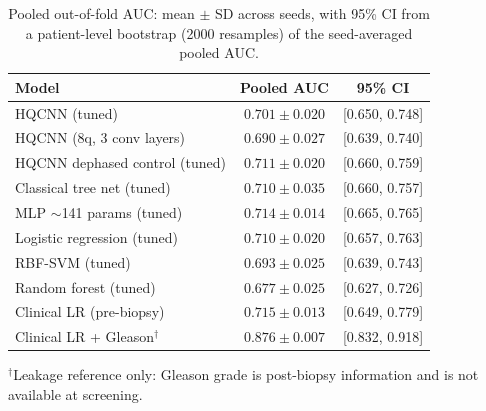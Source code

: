 \begin{table}[t]
\centering
\caption{Pooled out-of-fold AUC: mean $\pm$ SD across seeds, with 95\% CI from a patient-level bootstrap (2000 resamples) of the seed-averaged pooled AUC.}
\label{tab:v3_pooled}
\small
\begin{tabular}{lcc}
\toprule
Model & Pooled AUC & 95\% CI \\
\midrule
HQCNN (tuned) & $0.701 \pm 0.020$ & [0.650, 0.748] \\
HQCNN (8q, 3 conv layers) & $0.690 \pm 0.027$ & [0.639, 0.740] \\
HQCNN dephased control (tuned) & $0.711 \pm 0.020$ & [0.660, 0.759] \\
Classical tree net (tuned) & $0.710 \pm 0.035$ & [0.660, 0.757] \\
MLP $\sim$141 params (tuned) & $0.714 \pm 0.014$ & [0.665, 0.765] \\
Logistic regression (tuned) & $0.710 \pm 0.020$ & [0.657, 0.763] \\
RBF-SVM (tuned) & $0.693 \pm 0.025$ & [0.639, 0.743] \\
Random forest (tuned) & $0.677 \pm 0.025$ & [0.627, 0.726] \\
Clinical LR (pre-biopsy) & $0.715 \pm 0.013$ & [0.649, 0.779] \\
Clinical LR + Gleason$^{\dagger}$ & $0.876 \pm 0.007$ & [0.832, 0.918] \\
\bottomrule
\end{tabular}
\par\smallskip\footnotesize $^{\dagger}$Leakage reference only: Gleason grade is post-biopsy information and is not available at screening.
\end{table}
